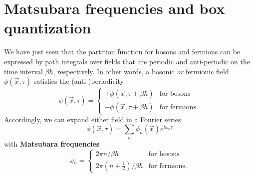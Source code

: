 \iffalse
The partition function is therefore
\begin{equation}
\begin{split}
	Z &= \int \dif \psi_0^\dagger \int \dif \psi_0 \, e^{-\psi_{n+1}^\dagger \psi_{n+1}} \braket{-\psi_0 | e^{-\beta(\hat{H} - \mu \hat{N})} | \psi_0} \\
	  &= \prod_n \int \dif \psi_n^\dagger \int \dif \psi_n \, e^{-\psi_{n+1}^\dagger \psi_{n+1}} \braket{\psi_{n+1} | e^{-(\hat{H} - \mu \hat{N}) \Delta \tau / \hbar} | \psi_n} \\
	  &= \prod_n \int \dif \psi_n^\dagger \int \dif \psi_n \, e^{-\psi_{n+1}^\dagger \psi_{n+1}} \braket{\psi_{n+1} | \psi_n} e^{-(H_n - \mu N) \Delta \tau / \hbar} \\
	  &= \prod_n \int \dif \psi_n^\dagger \int \dif \psi_n \, \exp \left\{ -\frac{\Delta t}{\hbar} \sum_n \int \dif^3 x \left( \psi^\dagger_{n+1} \frac{\psi_{n+1} - \psi_n}{\Delta t} + \ham - \mu \numdensity \right) \right\} \\
	  &= \oint_- \pathintdif \psi^\dagger \oint_- \pathintdif \psi \exp \left\{ \frac{1}{\hbar} \int_0^{\beta \hbar} \dif \tau \int \dif^3 x \left( -\psi^\dagger(\vec{x},\tau) \dot{\psi}(\vec{x},\tau) - \ham \left( \psi^\dagger(\vec{x},\tau), \psi(\vec{x},\tau) \right) + \mu \numdensity \right) \right\} \\
\end{split}
\end{equation}
\fi

\section{Matsubara frequencies and box quantization}
\label{sec:matsubara_quantization}

We have just seen that the partition function for bosons and fermions can be expressed by path integrals over fields that are periodic and anti-periodic on the time interval $\beta \hbar$, respectively.
In other words, a bosonic \emph{or} fermionic field $\phi(\vec{x}, \tau)$ satisfies the (anti-)periodicity
\begin{equation}
	\phi(\vec{x}, \tau) = \begin{cases}
		+ \phi(\vec{x}, \tau + \beta \hbar) & \text{for bosons} \\
		- \phi(\vec{x}, \tau + \beta \hbar) & \text{for fermions} .
	\end{cases}
\label{eq:tft:periodicity}
\end{equation}
Accordingly, we can expand either field in a Fourier series
\begin{equation}
	\phi(\vec{x}, \tau) = \sum_n \phi_n(\vec{x}) e^{i \omega_n \tau}
\end{equation}
with \textbf{Matsubara frequencies} 
\begin{equation}
	\omega_n = \begin{cases}
		2 \pi n / \beta \hbar    & \text{for bosons} \\
		2 \pi (n+\frac12) / \beta \hbar & \text{for fermions} .
	\end{cases}
\label{eq:tft:matsubara_frequencies}
\end{equation}

